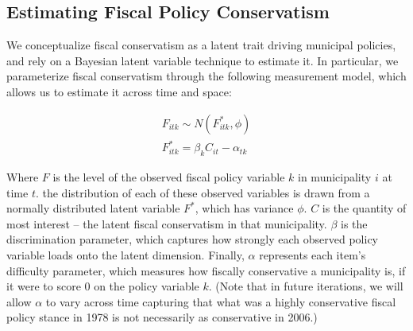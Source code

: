 \documentclass[a4paper,12pt]{article}
\begin{document}

\subsection*{Estimating Fiscal Policy Conservatism}
We conceptualize fiscal conservatism as a latent trait driving municipal policies, and rely on a Bayesian latent variable technique to estimate it. In particular, we parameterize fiscal conservatism through the following measurement model, which allows us to estimate it across time and space:

\begin{gather*}
F_{itk} \sim N(F^*_{itk}, \phi)\\
F^*_{itk} = \beta_k C_{it} - \alpha_{tk}
\end{gather*}

\noindent Where $F$ is the level of the observed fiscal policy variable $k$ in municipality $i$ at time $t$. the distribution of each of these observed variables is drawn from a normally distributed latent variable $F^*$, which has variance $\phi$. $C$ is the quantity of most interest -- the latent fiscal conservatism in that municipality. $\beta$ is the discrimination parameter, which captures how strongly each observed policy variable loads onto the latent dimension. Finally, $\alpha$ represents each item's difficulty parameter, which measures how fiscally conservative a municipality is, if it were to score 0 on the policy variable $k$. (Note that in future iterations, we will allow $\alpha$ to vary across time capturing that what was a highly conservative fiscal policy stance in 1978 is not necessarily as conservative in 2006.)
\end{document}
